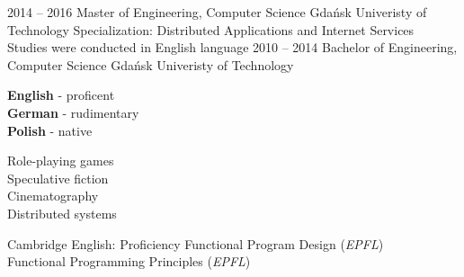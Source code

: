 \documentclass[9pt]{style/developercv}
\begin{document}


\begin{entrylist}
	\entry
		{2014 -- 2016}
		{Master of Engineering, Computer Science}
		{Gdańsk Univeristy of Technology}
		{
			Specialization: Distributed Applications and Internet Services \\
			Studies were conducted in English language
		}
	\entry
		{2010 -- 2014}
		{Bachelor of Engineering, Computer Science}
		{Gdańsk Univeristy of Technology}
		{}
\end{entrylist}


\begin{minipage}[t]{0.3\textwidth}
	\vspace{-\baselineskip}


	\textbf{English} - proficent\\
	\textbf{German} - rudimentary\\
	\textbf{Polish} - native
\end{minipage}
\hfill
\begin{minipage}[t]{0.3\textwidth}
	\vspace{-\baselineskip}
	
	
	Role-playing games\\
	Speculative fiction\\
	Cinematography\\
	Distributed systems
\end{minipage}
\hfill
\begin{minipage}[t]{0.3\textwidth}
	\vspace{-\baselineskip}
	
	
	Cambridge English: Proficiency
	Functional Program Design (\textit{EPFL})\\
	Functional Programming Principles (\textit{EPFL})
\end{minipage}

\end{document}
